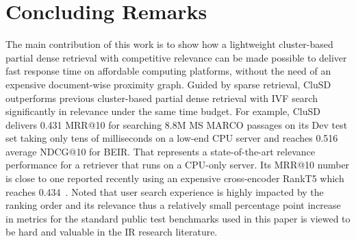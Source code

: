 \section{Concluding Remarks}

The main contribution of this work is  to  show  how 
a lightweight cluster-based partial dense retrieval 
with competitive  relevance can be made possible
to deliver fast response time on affordable computing platforms, without the need of an expensive  document-wise  proximity graph.
Guided by sparse retrieval, CluSD  outperforms  previous cluster-based partial dense retrieval with IVF 
search significantly in relevance under the same time budget.
For example, CluSD delivers 0.431 MRR@10  for searching 8.8M MS MARCO passages on its Dev test set taking only tens of milliseconds on a low-end CPU server
and reaches  0.516 average NDCG@10 for BEIR.  That represents a state-of-the-art relevance performance for a retriever that  runs on 
a CPU-only server. 
Its MRR@10 number is close to one reported recently using an expensive cross-encoder RankT5 which reaches 0.434~\cite{2023SIGIR-ZhuangRankT5}. 
Noted that user search experience is highly impacted by the ranking order and its relevance thus a relatively small percentage point increase  
in metrics for the standard public test benchmarks used in this paper is viewed to be hard and valuable in the IR research literature.


